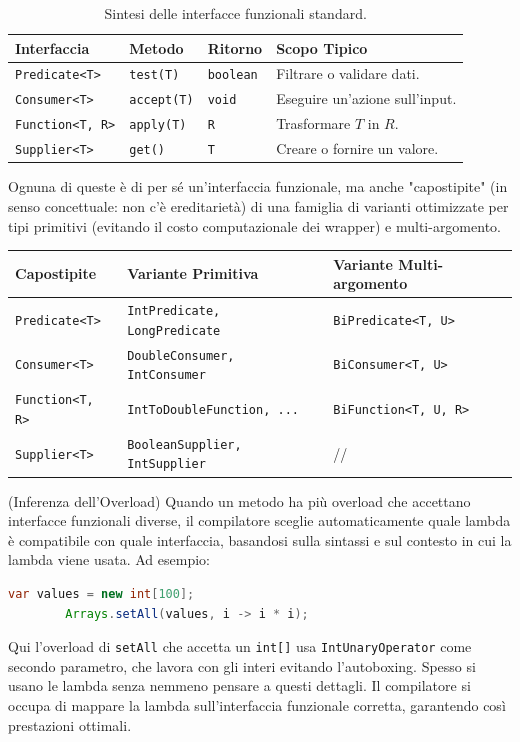 \begin{table}[ht]
\centering
\begin{tabular}{|l|l|l|l|}
\hline
\textbf{Interfaccia} & \textbf{Metodo} & \textbf{Ritorno} & \textbf{Scopo Tipico} \\ \hline
\texttt{Predicate<T>} & \texttt{test(T)} & \texttt{boolean} & Filtrare o validare dati. \\ \hline
\texttt{Consumer<T>} & \texttt{accept(T)} & \texttt{void} & Eseguire un'azione sull'input. \\ \hline
\texttt{Function<T, R>} & \texttt{apply(T)} & \texttt{R} & Trasformare $T$ in $R$. \\ \hline
\texttt{Supplier<T>} & \texttt{get()} & \texttt{T} & Creare o fornire un valore. \\ \hline
\end{tabular}
\caption{Sintesi delle interfacce funzionali standard.}
\end{table}

Ognuna di queste è di per sé un'interfaccia funzionale, ma anche "capostipite" (in senso concettuale: non c'è ereditarietà) di una famiglia di varianti ottimizzate per tipi primitivi (evitando il costo computazionale dei wrapper) e multi-argomento. 
\begin{table}[ht]
\centering
\begin{tabular}{|l|l|l|}
\hline
\textbf{Capostipite} & \textbf{Variante Primitiva} & \textbf{Variante Multi-argomento} \\ \hline
\texttt{Predicate<T>} & \texttt{IntPredicate, LongPredicate} & \texttt{BiPredicate<T, U>} \\ \hline
\texttt{Consumer<T>} & \texttt{DoubleConsumer, IntConsumer} & \texttt{BiConsumer<T, U>} \\ \hline
\texttt{Function<T, R>} & \texttt{IntToDoubleFunction, ...} & \texttt{BiFunction<T, U, R>} \\ \hline
\texttt{Supplier<T>} & \texttt{BooleanSupplier, IntSupplier} & // \\ \hline
\end{tabular}
\end{table}

\begin{observation}
    (Inferenza dell'Overload) Quando un metodo ha più overload che accettano interfacce funzionali diverse, il compilatore sceglie automaticamente quale lambda è compatibile con quale interfaccia, basandosi sulla sintassi e sul contesto in cui la lambda viene usata. Ad esempio:

    \begin{lstlisting}[language=Java]
        var values = new int[100];
        Arrays.setAll(values, i -> i * i);
    \end{lstlisting}

    Qui l'overload di \texttt{setAll} che accetta un  \texttt{int[]} usa \texttt{IntUnaryOperator} come secondo parametro, che lavora con gli interi evitando l'autoboxing. Spesso si usano le lambda senza nemmeno pensare a questi dettagli. Il compilatore si occupa di mappare la lambda sull'interfaccia funzionale corretta, garantendo così prestazioni ottimali.

\end{observation}

